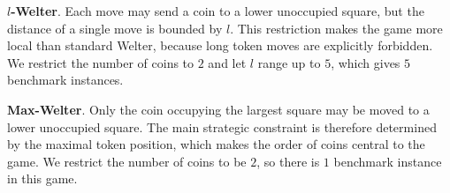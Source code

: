 \documentclass[review]{elsarticle}
\newcommand{\set}[1]{\{ #1 \}}
\newcommand{\tuple}[1]{\langle {#1} \rangle}
\newcommand{\true}{\top}
\newcommand{\statevar}{\mathcal{X}}
\newcommand{\act}{\mathcal{A}}
\newcommand{\constraint}{\mathcal{C}}
\newcommand{\estate}{\mathcal{E}}
\newcommand{\pre}{\mathtt{pre}}
\newcommand{\eff}{\mathtt{eff}}
\begin{document}
{\color{red}\textbf{$l$-Welter}. Each move may send a coin to a lower unoccupied square, but the distance of a single move is bounded by $l$.}
{\color{red}This restriction makes the game more local than standard Welter, because long token moves are explicitly forbidden.}
{\color{red}We restrict the number of coins to $2$ and let $l$ range up to $5$, which gives $5$ benchmark instances.}

{\color{red}\textbf{Max-Welter}. Only the coin occupying the largest square may be moved to a lower unoccupied square.}
{\color{red}The main strategic constraint is therefore determined by the maximal token position, which makes the order of coins central to the game.}
{\color{red}We restrict the number of coins to be $2$, so there is $1$ benchmark instance in this game.}
\end{document}
